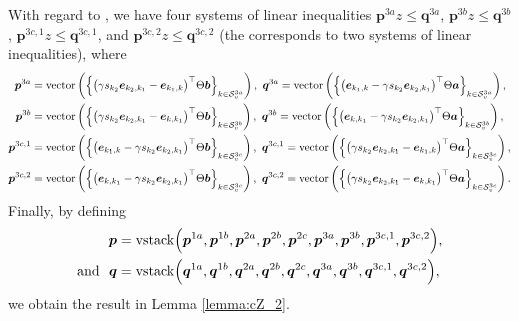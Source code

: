 %
With regard to , we have four systems of linear inequalities $\bm p^{3a} z \leq \bm q^{3a}$, $\bm p^{3b} z \leq \bm q^{3b}$, $\bm p^{3c, 1} z \leq \bm q^{3c, 1}$, and $\bm p^{3c, 2} z \leq \bm q^{3c, 2}$ (the  corresponds to two systems of linear inequalities), where 
%
\begin{align*}
	\bm p^{3a} & = {\rm vector} \left( \Big \{ \big (\gamma s_{k_2} \bm e_{k_2, k_1} - \bm e_{k_1, k} \big )^\top \Theta \bm b \Big \}_{k \in {\mathcal S}^{3a}_v} \right), ~
	\bm q^{3a} = {\rm vector} \left( \Big \{ \big (\bm e_{k_1, k} - \gamma s_{k_2} \bm e_{k_2, k_1} \big )^\top \Theta \bm a \Big \}_{k \in {\mathcal S}^{3a}_v} \right),\\ 
	\bm p^{3b} & = {\rm vector} \left( \Big \{ \big (\gamma s_{k_2} \bm e_{k_2, k_1} - \bm e_{k, k_1} \big )^\top \Theta \bm b \Big \}_{k \in {\mathcal S}^{3b}_v} \right), ~
	\bm q^{3b} = {\rm vector} \left( \Big \{ \big (\bm e_{k, k_1} - \gamma s_{k_2} \bm e_{k_2, k_1} \big )^\top \Theta \bm a \Big \}_{k \in {\mathcal S}^{3b}_v} \right), \\
	\bm p^{3c, 1} & = {\rm vector} \left( \Big \{ \big ( \bm e_{k_1, k} - \gamma s_{k_2} \bm e_{k_2, k_1} \big )^\top \Theta \bm b \Big \}_{k \in {\mathcal S}^{3c}_v} \right), ~
	\bm q^{3c, 1} = {\rm vector} \left( \Big \{ \big (\gamma s_{k_2} \bm e_{k_2, k_1} - \bm e_{k_1, k}\big )^\top \Theta \bm a \Big \}_{k \in {\mathcal S}^{3c}_v} \right) ,\\
	\bm p^{3c, 2} & = {\rm vector} \left( \Big \{ \big ( \bm e_{k, k_1} - \gamma s_{k_2} \bm e_{k_2, k_1} \big )^\top \Theta \bm b \Big \}_{k \in {\mathcal S}^{3c}_v} \right), ~
	\bm q^{3c, 2} = {\rm vector} \left( \Big \{ \big (\gamma s_{k_2} \bm e_{k_2, k_1} - \bm e_{k, k_1}\big )^\top \Theta \bm a \Big \}_{k \in {\mathcal S}^{3c}_v} \right).
\end{align*}
%
Finally, by defining 
\begin{align}
	\bm p &= {\rm vstack} \Big ( \bm p^{1a}, \bm p^{1b}, \bm p^{2a}, \bm p^{2b}, \bm p^{2c}, \bm p^{3a}, \bm p^{3b}, \bm p^{3c, 1}, \bm p^{3c, 2}\Big ), \\ 
	\text{and} ~~ \bm q &= {\rm vstack} \Big ( \bm q^{1a}, \bm q^{1b}, \bm q^{2a}, \bm q^{2b}, \bm q^{2c}, \bm q^{3a}, \bm q^{3b}, \bm q^{3c, 1}, \bm q^{3c, 2}\Big ),
\end{align}
%
we obtain the result in Lemma \ref{lemma:cZ_2}.

